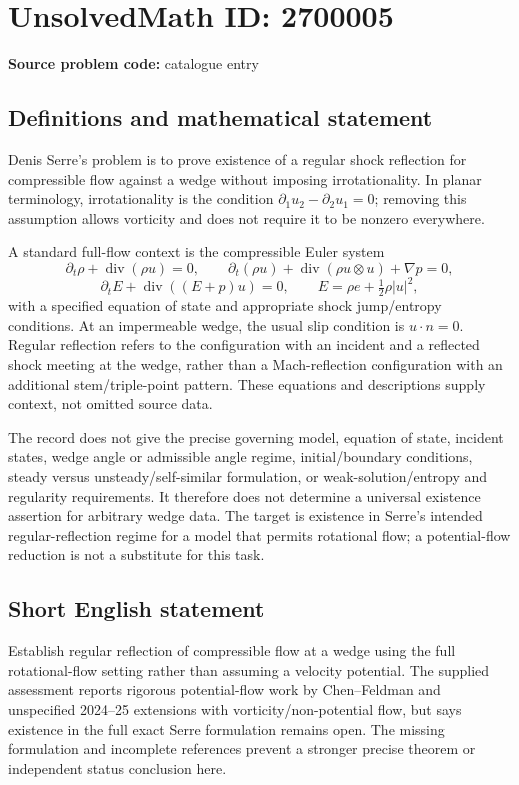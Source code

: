 \documentclass[11pt]{article}
\begin{document}
\section*{UnsolvedMath ID: 2700005}
\textbf{Source problem code:} catalogue entry
\subsection{Definitions and mathematical statement}
Denis Serre's problem is to prove existence of a regular shock reflection for compressible flow against a wedge without imposing irrotationality. In planar terminology, irrotationality is the condition $\partial_1u_2-\partial_2u_1=0$; removing this assumption allows vorticity and does not require it to be nonzero everywhere.

A standard full-flow context is the compressible Euler system
\[
 \partial_t\rho+\operatorname{div}(\rho u)=0,
 \qquad
 \partial_t(\rho u)+\operatorname{div}(\rho u\otimes u)+\nabla p=0,
\]
\[
 \partial_t E+\operatorname{div}((E+p)u)=0,
 \qquad E=\rho e+\tfrac12\rho|u|^2,
\]
with a specified equation of state and appropriate shock jump/entropy conditions. At an impermeable wedge, the usual slip condition is $u\cdot n=0$. Regular reflection refers to the configuration with an incident and a reflected shock meeting at the wedge, rather than a Mach-reflection configuration with an additional stem/triple-point pattern. These equations and descriptions supply context, not omitted source data.

The record does not give the precise governing model, equation of state, incident states, wedge angle or admissible angle regime, initial/boundary conditions, steady versus unsteady/self-similar formulation, or weak-solution/entropy and regularity requirements. It therefore does not determine a universal existence assertion for arbitrary wedge data. The target is existence in Serre's intended regular-reflection regime for a model that permits rotational flow; a potential-flow reduction is not a substitute for this task.
\subsection{Short English statement}
Establish regular reflection of compressible flow at a wedge using the full rotational-flow setting rather than assuming a velocity potential. The supplied assessment reports rigorous potential-flow work by Chen--Feldman and unspecified 2024--25 extensions with vorticity/non-potential flow, but says existence in the full exact Serre formulation remains open. The missing formulation and incomplete references prevent a stronger precise theorem or independent status conclusion here.
\end{document}
